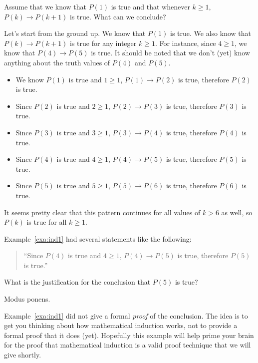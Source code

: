 \begin{exa}\label{exa:ind1}
Assume that we know that $P(1)$ is true and that 
whenever $k\geq 1$, $P(k)\rightarrow P(k+1)$ is true.  What can we conclude?
\begin{sol}
Let's start from the ground up.
We know that $P(1)$ is true.  We also know that $P(k)\rightarrow P(k+1)$ is true for 
any integer $k\geq 1$.  
For instance, since $4\geq 1$, we know that $P(4)\rightarrow P(5)$ is true.  
It should be noted that we don't (yet) know anything about the truth values of 
$P(4)$ and $P(5)$.
\begin{itemize}
\item 
We know $P(1)$ is true and $1\geq 1$, $P(1)\rightarrow P(2)$ is true, therefore $P(2)$ is true.
\item
Since $P(2)$ is true and $2\geq 1$, $P(2)\rightarrow P(3)$ is true, therefore $P(3)$ is true.
\item
Since $P(3)$ is true and $3\geq 1$, $P(3)\rightarrow P(4)$ is true, therefore $P(4)$ is true.
\item
Since $P(4)$ is true and $4\geq 1$, $P(4)\rightarrow P(5)$ is true, therefore $P(5)$ is true.
\item
Since $P(5)$ is true and $5\geq 1$, $P(5)\rightarrow P(6)$ is true, therefore $P(6)$ is true.
\end{itemize}
It seems pretty clear that this pattern continues for all values of $k>6$ as well, 
so $P(k)$ is true for all $k\geq 1$.
\end{sol}
\end{exa}

\begin{ques}
Example~\ref{exa:ind1} had several statements like the following:
\begin{quote}
``Since $P(4)$ is true and $4\geq 1$, $P(4)\rightarrow P(5)$ is true, therefore $P(5)$ is true.''
\end{quote}
What is the justification for the conclusion that $P(5)$ is true?

\noindent
\answerline
\begin{answer}
Modus ponens.
\end{answer}
\end{ques}

Example~\ref{exa:ind1} did not give a formal
{\em proof} of the conclusion. 
The idea is to get you thinking
about how mathematical induction works, 
not to provide a formal proof that it does (yet).
Hopefully this example will help prime your brain for the proof that 
mathematical induction is a valid proof technique that we will 
give shortly.

